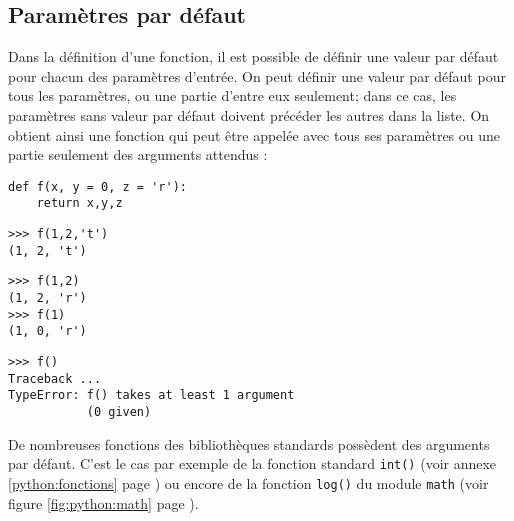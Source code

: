 \subsection{Paramètres par défaut}
Dans la définition d'une fonction, il est possible de définir une
valeur par défaut pour chacun des paramètres d'entrée. 
On peut définir une valeur par défaut pour tous les paramètres, ou une partie d'entre eux
seulement; dans ce cas, les paramètres sans valeur par défaut doivent précéder les autres
dans la liste.
On obtient ainsi une fonction qui 
peut être appelée avec tous ses paramètres ou une partie seulement des arguments attendus :

\noindent\mbox{}\hspace*{1cm}\begin{py}{6cm}
\begin{verbatim}
def f(x, y = 0, z = 'r'):
    return x,y,z
\end{verbatim}
\end{py}
\hfill
\begin{py}{6cm}
\begin{verbatim}
>>> f(1,2,'t')
(1, 2, 't')
\end{verbatim}
\end{py}
\hspace*{1cm}\mbox{}\vspace*{2mm}

\noindent\mbox{}\hspace*{1cm}\begin{py}{6cm}
\begin{verbatim}
>>> f(1,2)
(1, 2, 'r')
>>> f(1)
(1, 0, 'r')
\end{verbatim}
\end{py}
\hfill
\begin{py}{6cm}
\begin{verbatim}
>>> f()
Traceback ...
TypeError: f() takes at least 1 argument
           (0 given)
\end{verbatim}
\end{py}
\hspace*{1cm}\mbox{}\vspace*{2mm}


\noindent De nombreuses fonctions des bibliothèques standards possèdent des
arguments par défaut. C'est le cas par exemple de la fonction standard {\tt int()} 
(voir annexe \ref{python:fonctions} page \pageref{python:fonctions})
ou encore de la fonction {\tt log()} du module {\tt math} 
(voir figure \ref{fig:python:math} page \pageref{fig:python:math}).

